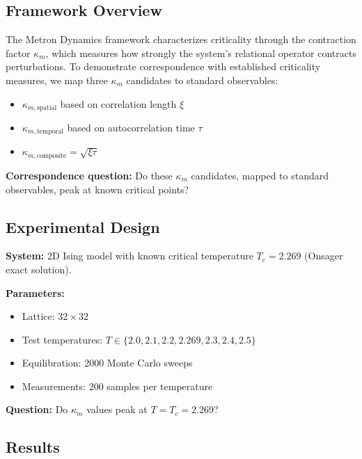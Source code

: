 \documentclass[11pt]{article}
\begin{document}
\subsection{Framework Overview}

The Metron Dynamics framework characterizes criticality through the contraction factor $\kappa_m$, which measures how strongly the system's relational operator contracts perturbations. To demonstrate correspondence with established criticality measures, we map three $\kappa_m$ candidates to standard observables:
\begin{itemize}
    \item $\kappa_{m,\text{spatial}}$ based on correlation length $\xi$
    \item $\kappa_{m,\text{temporal}}$ based on autocorrelation time $\tau$
    \item $\kappa_{m,\text{composite}} = \sqrt{\xi\tau}$
\end{itemize}

\textbf{Correspondence question:} Do these $\kappa_m$ candidates, mapped to standard observables, peak at known critical points?

\subsection{Experimental Design}

\textbf{System:} 2D Ising model with known critical temperature $T_c = 2.269$ (Onsager exact solution).

\textbf{Parameters:}
\begin{itemize}
    \item Lattice: $32 \times 32$
    \item Test temperatures: $T \in \{2.0, 2.1, 2.2, 2.269, 2.3, 2.4, 2.5\}$
    \item Equilibration: 2000 Monte Carlo sweeps
    \item Measurements: 200 samples per temperature
\end{itemize}

\textbf{Question:} Do $\kappa_m$ values peak at $T = T_c = 2.269$?

\subsection{Results}
\end{document}
